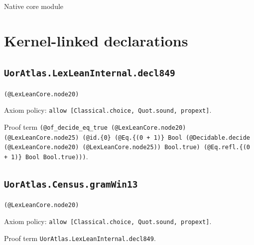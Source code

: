 \documentclass[11pt]{article}
\begin{document}
\begin{center}{\LARGE Native core module}\end{center}
\section*{Kernel-linked declarations}
\subsection*{\texttt{UorAtlas.LexLeanInternal.decl849}}
\noindent\texttt{(@LexLeanCore.node20)}\par
\noindent Axiom policy: \texttt{allow [Classical.choice, Quot.sound, propext]}.\par
\noindent Proof term \texttt{(@of\_decide\_eq\_true (@LexLeanCore.node20) (@LexLeanCore.node25) (@id.\{0\} (@Eq.\{(0 + 1)\} Bool (@Decidable.decide (@LexLeanCore.node20) (@LexLeanCore.node25)) Bool.true) (@Eq.refl.\{(0 + 1)\} Bool Bool.true)))}.\par
\subsection*{\texttt{UorAtlas.Census.gramWin13}}
\noindent\texttt{(@LexLeanCore.node20)}\par
\noindent Axiom policy: \texttt{allow [Classical.choice, Quot.sound, propext]}.\par
\noindent Proof term \texttt{UorAtlas.LexLeanInternal.decl849}.\par
\end{document}

